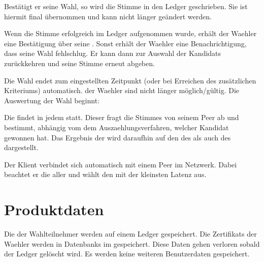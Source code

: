 \documentclass[parskip=full,11pt,twoside]{scrartcl}
\begin{document}
Bestätigt er seine \gls{Wahl}, so wird die \gls{Stimme} in den \gls{Ledger} geschrieben.
Sie ist hiermit final übernommen und kann nicht länger geändert werden.

Wenn die \gls{Stimme} erfolgreich im \gls{Ledger} aufgenommen wurde, erhält der \gls{Waehler} eine Bestätigung über seine .
Sonst erhält der \gls{Waehler} eine Benachrichtigung, dass seine \gls{Wahl} fehlschlug.
Er kann dann zur Auswahl der \glspl{Kandidat} zurückkehren und seine \gls{Stimme} erneut abgeben.

Die \gls{Wahl} endet zum eingestellten Zeitpunkt (oder bei Erreichen des zusätzlichen Kriteriums) automatisch.  der \gls{Waehler} sind nicht länger möglich/gültig. Die Auswertung der \gls{Wahl} beginnt:

Die  findet in jedem  statt. Dieser fragt die \glspl{Stimme} von seinem \gls{Peer} ab und bestimmt, abhängig vom dem \gls{Auszaehlungsverfahren}, welcher \gls{Kandidat} gewonnen hat. Das Ergebnis der  wird daraufhin auf den  des  als auch des  dargestellt.

Der \gls{Klient} verbindet sich automatisch mit einem \gls{Peer} im \gls{Netzwerk}. Dabei beachtet er die  aller  und wählt den mit der kleinsten \gls{Latenz} aus.

\section{Produktdaten}

Die  der Wahlteilnehmer werden auf einem \gls{Ledger} gespeichert.
Die \glspl{Zertifikat} der \gls{Waehler} werden in \glspl{Datenbank} im  gespeichert.
Diese Daten gehen verloren sobald der \gls{Ledger} gelöscht wird. Es werden keine weiteren \gls{Benutzerdaten} gespeichert.
\end{document}
